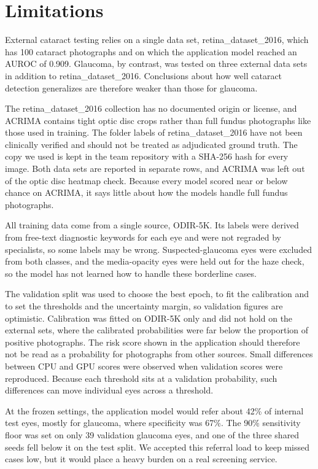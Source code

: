 \documentclass[conference,a4paper]{IEEEtran}
\begin{document}
\section{Limitations}

External cataract testing relies on a single data set, retina\_dataset\_2016, which has 100 cataract
photographs and on which the application model reached an AUROC of 0.909. Glaucoma, by contrast, was
tested on three external data sets in addition to retina\_dataset\_2016. Conclusions about how well
cataract detection generalizes are therefore weaker than those for glaucoma.

The retina\_dataset\_2016 collection has no documented origin or license, and ACRIMA contains tight
optic disc crops rather than full fundus photographs like those used in training. The folder labels
of retina\_dataset\_2016 have not been clinically verified and should not be treated as adjudicated
ground truth. The copy we used is kept in the team repository with a SHA-256 hash for every image.
Both data sets are reported in separate rows, and ACRIMA was left out of the optic disc heatmap
check. Because every model scored near or below chance on ACRIMA, it says little about how the
models handle full fundus photographs.

All training data come from a single source, ODIR-5K. Its labels were derived from free-text
diagnostic keywords for each eye and were not regraded by specialists, so some labels may be wrong.
Suspected-glaucoma eyes were excluded from both classes, and the media-opacity eyes were held out
for the haze check, so the model has not learned how to handle these borderline cases.

The validation split was used to choose the best epoch, to fit the calibration and to set the
thresholds and the uncertainty margin, so validation figures are optimistic. Calibration was fitted
on ODIR-5K only and did not hold on the external sets, where the calibrated probabilities were far
below the proportion of positive photographs. The risk score shown in the application should
therefore not be read as a probability for photographs from other sources. Small differences between
CPU and GPU scores were observed when validation scores were reproduced. Because each threshold sits
at a validation probability, such differences can move individual eyes across a threshold.

At the frozen settings, the application model would refer about 42\% of internal test eyes, mostly
for glaucoma, where specificity was 67\%. The 90\% sensitivity floor was set on only 39 validation
glaucoma eyes, and one of the three shared seeds fell below it on the test split. We accepted this
referral load to keep missed cases low, but it would place a heavy burden on a real screening
service.
\end{document}
